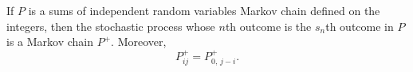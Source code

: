 If $P$ is a sums of independent random variables Markov chain defined on the integers, then the stochastic process whose $n$th outcome is the $s_n$th outcome in $P$ is a Markov chain $P^+$. Moreover,
$$P_{ij}^+ = P_{0,\,j-i}^+.$$

